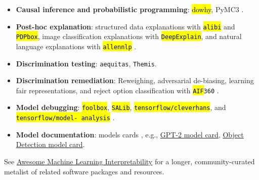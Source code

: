 \documentclass[information,article,accept,moreauthors,pdftex]{Definitions/mdpi}
\begin{document}
{{{\begin{itemize}[leftmargin=*,labelsep=5.8mm]
\item \textbf{Causal inference and probabilistic programming}: 
{\hl{dowhy}}, 
{PyMC3} \cite{book_of_why}.

\item \textbf{Post-hoc explanation}: structured data explanations with 
{\texttt{\hl{alibi}}} and 
{\texttt{\hl{PDPbox}}}, image classification explanations with 
{\texttt{\hl{DeepExplain}}}, and natural language explanations with 
{\texttt{\hl{allennlp}}} \cite{wachter2017counterfactual,grad_attr,wallace2019allennlp}. 

\item \textbf{Discrimination testing}: 
{\texttt{aequitas}}, 
{\texttt{Themis}}.

\item \textbf{Discrimination remediation}: Reweighing, adversarial de-biasing, learning fair representations, and reject option classification with 
{\texttt{\hl{AIF}360}} \cite{kamiran2012data,zhang2018mitigating,lfr,kamiran2012decision}.

\item \textbf{Model debugging}: 
{\texttt{\hl{foolbox}}}, 
{\texttt{\hl{SALib}}}, 
{\texttt{\hl{tensorflow/cleverhans}}}, and 
{\texttt{\hl{tensorflow/model- analysis}}} \cite{rauber2017foolbox,papernot2018cleverhans,modeltracker,papernot2018marauder}.

\item \textbf{Model documentation}: models cards \cite{model_cards}, e.g.,  
\href{https://github.com/openai/gpt-2/blob/master/model_card.md}{GPT-2 model card}, 
\href{https://modelcards.withgoogle.com/object-detection}{Object Detection model card}. 

\end{itemize}


See 
\href{https://github.com/jphall663/awesome-machine-learning-interpretability}
{Awesome Machine Learning Interpretability} for a longer, community-curated metalist of related software packages and resources. 

}}}
\end{document}

